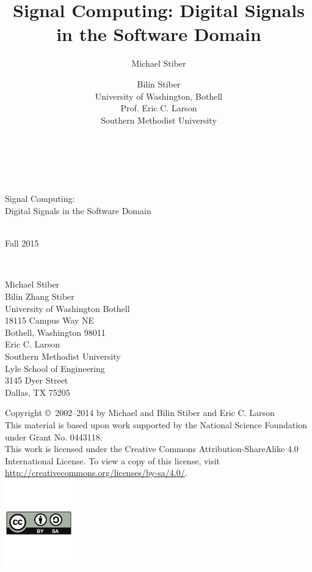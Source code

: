 \documentclass[12pt]{book}
\title{Signal Computing: Digital Signals in the Software Domain}
\author{Michael Stiber \and Bilin Stiber\\ 
{\normalsize University of Washington, Bothell}\\
{\normalsize Prof. Eric C. Larson}\\
{\normalsize Southern Methodist University}}
\begin{document}
\begin{titlepage}

\mbox{}\\[0.5in]
\begin{center}
\mbox{}\hrulefill\mbox{}\\[0.25in]
{\Huge Signal Computing:}\\[0.25in]
{\LARGE Digital Signals in the Software Domain}\\[0.25in]
\mbox{}\hrulefill\mbox{}\\[3in]

\mbox{}\hfill
\parbox{1.5in}{\mbox{}}
\parbox{3in}{Fall 2015}\\[0.25in]
\mbox{}\hfill
\parbox{3in}{\raggedright
Michael Stiber\\
Bilin Zhang Stiber\\
University of Washington Bothell\\
18115 Campus Way NE\\
Bothell, Washington 98011\\[0.25in]
Eric C. Larson\\
Southern Methodist University\\
Lyle School of Engineering\\
3145 Dyer Street\\
Dallas, TX 75205}
\end{center}

\newpage
\mbox{}\vspace{2in}
\begin{flushright}
Copyright \copyright\ 2002--2014 by Michael and Bilin Stiber and Eric
C. Larson\\[1in]
This material is based upon work supported by the National Science
Foundation under Grant No. 0443118.\\[2in]
This work is licensed under the Creative Commons
Attribution-ShareAlike 4.0 International License. To view a copy of
this license, visit
\url{http://creativecommons.org/licenses/by-sa/4.0/}.\\
\includegraphics[height=1.5in]{by-sa}
\end{flushright}

\thispagestyle{empty}

\end{titlepage}
\end{document}
